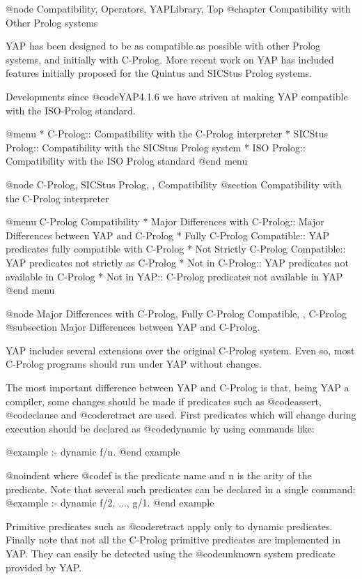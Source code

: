 @node Compatibility, Operators, YAPLibrary, Top
@chapter Compatibility with Other Prolog systems

YAP has been designed to be as compatible as possible with
other Prolog systems, and initially with C-Prolog. More recent work on
YAP has included features initially proposed for the Quintus
and SICStus Prolog systems.

Developments since @code{YAP4.1.6} we have striven at making
YAP compatible with the ISO-Prolog standard. 

@menu
* C-Prolog:: Compatibility with the C-Prolog interpreter
* SICStus Prolog:: Compatibility with the SICStus Prolog system
* ISO Prolog::  Compatibility with the ISO Prolog standard
@end menu

@node C-Prolog, SICStus Prolog, , Compatibility
@section Compatibility with the C-Prolog interpreter

@menu
C-Prolog Compatibility
* Major Differences with C-Prolog:: Major Differences between YAP and C-Prolog
* Fully C-Prolog Compatible:: YAP predicates fully compatible with
C-Prolog
* Not Strictly C-Prolog Compatible:: YAP predicates not strictly as C-Prolog
* Not in C-Prolog:: YAP predicates not available in C-Prolog
* Not in YAP:: C-Prolog predicates not available in YAP
@end menu

@node Major Differences with C-Prolog, Fully C-Prolog Compatible, , C-Prolog
@subsection Major Differences between YAP and C-Prolog.

YAP includes several extensions over the original C-Prolog system. Even
so, most C-Prolog programs should run under YAP without changes.

The most important difference between YAP and C-Prolog is that, being
YAP a compiler, some changes should be made if predicates such as
@code{assert}, @code{clause} and @code{retract} are used. First
predicates which will change during execution should be declared as
@code{dynamic} by using commands like:

@example
:- dynamic f/n.
@end example

@noindent where @code{f} is the predicate name and n is the arity of the
predicate. Note that  several such predicates can be declared in a
single command:
@example
 :- dynamic f/2, ..., g/1.
@end example

Primitive predicates such as @code{retract} apply only to dynamic
predicates.  Finally note that not all the C-Prolog primitive predicates
are implemented in YAP. They can easily be detected using the
@code{unknown} system predicate provided by YAP.

